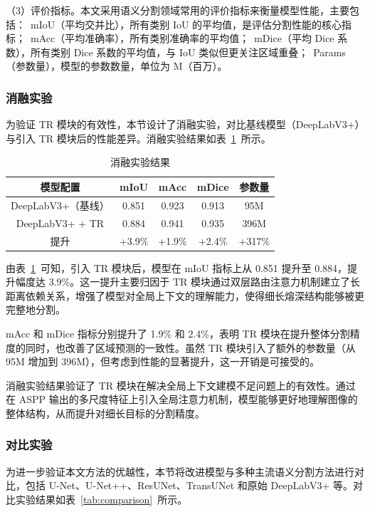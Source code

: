 （3）评价指标。本文采用语义分割领域常用的评价指标来衡量模型性能，主要包括：~mIoU（平均交并比），所有类别 IoU 的平均值，是评估分割性能的核心指标；~mAcc（平均准确率），所有类别准确率的平均值；~mDice（平均 Dice 系数），所有类别 Dice 系数的平均值，与 IoU 类似但更关注区域重叠；~Params（参数量），模型的参数数量，单位为 M（百万）。

\subsubsection{消融实验}

为验证 TR 模块的有效性，本节设计了消融实验，对比基线模型（DeepLabV3+）与引入 TR 模块后的性能差异。消融实验结果如表~\ref{tab:ablation_tr}~所示。

\begin{table}[htbp]
\centering
\caption{消融实验结果}
\label{tab:ablation_tr}
\begin{tabular}{ccccc}
\toprule
模型配置 & mIoU & mAcc & mDice & 参数量 \\
\midrule
DeepLabV3+（基线） & 0.851 & 0.923 & 0.913 & 95M \\
DeepLabV3+ + TR & 0.884 & 0.941 & 0.935 & 396M \\
\midrule
提升 & +3.9\% & +1.9\% & +2.4\% & +317\% \\
\bottomrule
\end{tabular}
\end{table}

由表~\ref{tab:ablation_tr}~可知，引入 TR 模块后，模型在 mIoU 指标上从 0.851 提升至 0.884，提升幅度达 3.9\%。这一提升主要归因于 TR 模块通过双层路由注意力机制建立了长距离依赖关系，增强了模型对全局上下文的理解能力，使得细长熔深结构能够被更完整地分割。

mAcc 和 mDice 指标分别提升了 1.9\% 和 2.4\%，表明 TR 模块在提升整体分割精度的同时，也改善了区域预测的一致性。虽然 TR 模块引入了额外的参数量（从 95M 增加到 396M），但考虑到性能的显著提升，这一开销是可接受的。

消融实验结果验证了 TR 模块在解决全局上下文建模不足问题上的有效性。通过在 ASPP 输出的多尺度特征上引入全局注意力机制，模型能够更好地理解图像的整体结构，从而提升对细长目标的分割精度。

\subsubsection{对比实验}

为进一步验证本文方法的优越性，本节将改进模型与多种主流语义分割方法进行对比，包括 U-Net、U-Net++、ResUNet、TransUNet 和原始 DeepLabV3+ 等。对比实验结果如表~\ref{tab:comparison}~所示。

